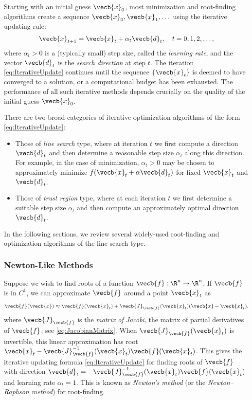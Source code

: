 Starting with an initial guess $\vecb{x}_0$, most minimization and root-finding algorithms create a sequence $\vecb{x}_0, \vecb{x}_1, \dots$ using the iterative updating rule:
\begin{equation}
	\vecb{x}_{t+1} = \vecb{x}_t + \alpha_t \vecb{d}_t, \quad t = 0, 1, 2, \dots, \label{eq:IterativeUpdate}
\end{equation}
where $\alpha_t > 0$ is a (typically small) step size, called the \textit{learning rate}, and the vector $\vecb{d}_t$ is the \textit{search direction} at step $t$. The iteration \cref{eq:IterativeUpdate} continues until the sequence $\{\vecb{x}_t\}$ is deemed to have converged to a solution, or a computational budget has been exhausted. The performance of all such iterative methods depends crucially on the quality of the initial guess $\vecb{x}_0$.

There are two broad categories of iterative optimization algorithms of the form \cref{eq:IterativeUpdate}:
\begin{itemize}
	\item Those of \textit{line search} type, where at iteration $t$ we first compute a direction $\vecb{d}_t$ and then determine a reasonable step size $\alpha_t$ along this direction. For example, in the case of minimization, $\alpha_t > 0$ may be chosen to approximately minimize $f(\vecb{x}_t + \alpha \vecb{d}_t)$ for fixed $\vecb{x}_t$ and $\vecb{d}_t$.
	\item Those of \textit{trust region} type, where at each iteration $t$ we first determine a suitable step size $\alpha_t$ and then compute an approximately optimal direction $\vecb{d}_t$.
\end{itemize}

In the following sections, we review several widely-used root-finding and optimization algorithms of the line search type.

\subsubsection{Newton-Like Methods}
Suppose we wish to find roots of a function $\vecb{f} : \R^n \to \R^n$. If $\vecb{f}$ is in $C^1$, we can approximate $\vecb{f}$ around a point $\vecb{x}_t$ as
\begin{equation*}
	\vecb{f}(\vecb{x}) \approx \vecb{f}(\vecb{x}_t) + \vecb{J}_{\vecb{f}}(\vecb{x}_t)(\vecb{x} - \vecb{x}_t),
\end{equation*}
where $\vecb{J}_{\vecb{f}}$ is the \textit{matrix of Jacobi}, the matrix of partial derivatives of $\vecb{f}$; see \cref{eq:JacobianMatrix}. When $\vecb{J}_{\vecb{f}}(\vecb{x}_t)$ is invertible, this linear approximation has root $\vecb{x}_t - \vecb{J}_{\vecb{f}}^{-1}(\vecb{x}_t) \vecb{f}(\vecb{x}_t)$. This gives the iterative updating formula \cref{eq:IterativeUpdate} for finding roots of $\vecb{f}$ with direction $\vecb{d}_t = -\vecb{J}_{\vecb{f}}^{-1}(\vecb{x}_t) \vecb{f}(\vecb{x}_t)$ and learning rate $\alpha_t = 1$. This is known as \textit{Newton's method} (or the \textit{Newton--Raphson method}) for root-finding.

